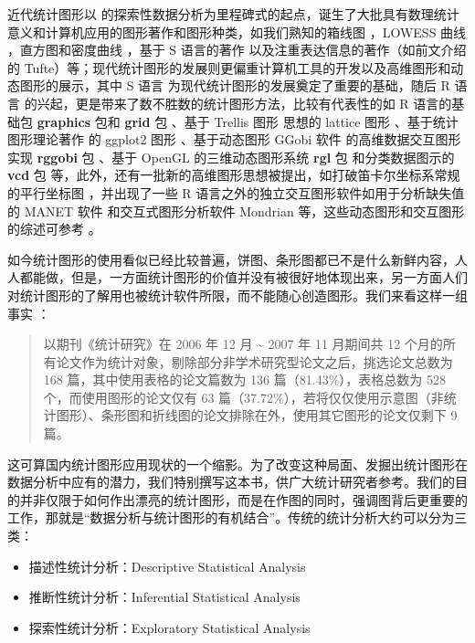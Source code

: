 \documentclass[
  b5paper,
  UTF8,twoside]{book}
\providecommand{\tightlist}{%
  \setlength{\itemsep}{0pt}\setlength{\parskip}{0pt}}
\begin{document}
近代统计图形以 \citet{Tukey1977} 的探索性数据分析为里程碑式的起点，诞生了大批具有数理统计意义和计算机应用的图形著作和图形种类，如我们熟知的箱线图 \citep{McGill78}，LOWESS 曲线 \citep{Cleveland79}，直方图和密度曲线 \citep{Scott92}，基于 S 语言的著作 \citep{Chambers83} 以及注重表达信息的著作（如前文介绍的 Tufte）等；现代统计图形的发展则更偏重计算机工具的开发以及高维图形和动态图形的展示，其中 S 语言 \citep{Becker88} 为现代统计图形的发展奠定了重要的基础，随后 R 语言 \citep{Ihaka96, base} 的兴起，更是带来了数不胜数的统计图形方法，比较有代表性的如 R 语言的基础包 \textbf{graphics} 包和 \textbf{grid} 包 \citep{Murrell05}、基于 Trellis 图形 \citep{Cleveland93} 思想的 lattice 图形 \citep{Sarkar08}、基于统计图形理论著作 \citet{Wilkinson05} 的 ggplot2 图形 \citep{ggplot2}、基于动态图形 GGobi 软件 \citep{Cook07} 的高维数据交互图形实现 \textbf{rggobi} 包 \citep{rggobi}、基于 OpenGL 的三维动态图形系统 \textbf{rgl} 包 \citep{rgl} 和分类数据图示的 \textbf{vcd} 包 \citep{vcd} 等，此外，还有一批新的高维图形思想被提出，如打破笛卡尔坐标系常规的平行坐标图 \citep{Inselberg07}，并出现了一些 R 语言之外的独立交互图形软件如用于分析缺失值的 MANET 软件 \citep{Unwin96} 和交互式图形分析软件 Mondrian \citep{Theus02} 等，这些动态图形和交互图形的综述可参考 \citet{Jurgen04}。

如今统计图形的使用看似已经比较普遍，饼图、条形图都已不是什么新鲜内容，人人都能做，但是，一方面统计图形的价值并没有被很好地体现出来，另一方面人们对统计图形的了解用也被统计软件所限，而不能随心创造图形。我们来看这样一组事实 \citep{Xie08}：

\begin{quote}
以期刊《统计研究》在 2006 年 12 月 \textasciitilde{} 2007 年 11 月期间共 12 个月的所有论文作为统计对象，剔除部分非学术研究型论文之后，挑选论文总数为 168 篇，其中使用表格的论文篇数为 136 篇（81.43\%），表格总数为 528 个，而使用图形的论文仅有 63 篇（37.72\%），若将仅仅使用示意图（非统计图形）、条形图和折线图的论文排除在外，使用其它图形的论文仅剩下 9 篇。
\end{quote}

这可算国内统计图形应用现状的一个缩影。为了改变这种局面、发掘出统计图形在数据分析中应有的潜力，我们特别撰写这本书，供广大统计研究者参考。我们的目的并非仅限于如何作出漂亮的统计图形，而是在作图的同时，强调图背后更重要的工作，那就是``数据分析与统计图形的有机结合''。传统的统计分析大约可以分为三类：

\begin{itemize}
\tightlist
\item
  描述性统计分析：Descriptive Statistical Analysis
\item
  推断性统计分析：Inferential Statistical Analysis
\item
  探索性统计分析：Exploratory Statistical Analysis
\end{itemize}
\end{document}
